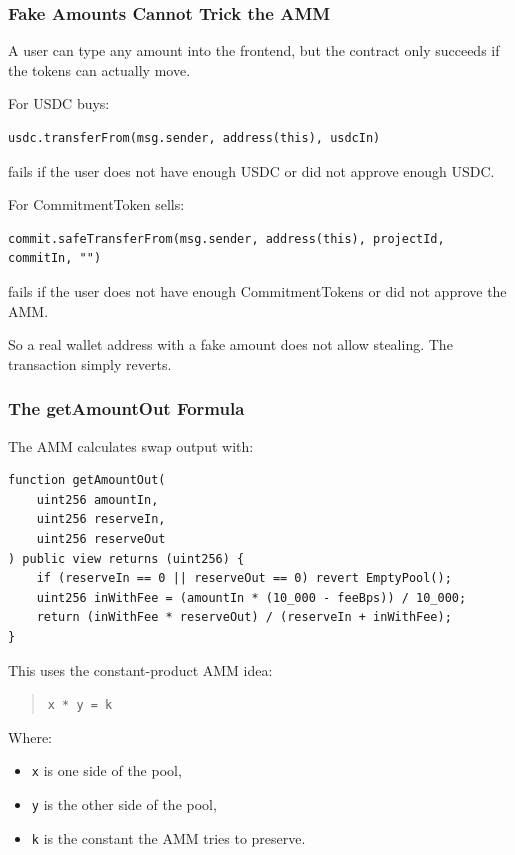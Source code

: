 \documentclass[11pt,a4paper]{article}
\begin{document}
\subsubsection{Fake Amounts Cannot Trick the AMM}

A user can type any amount into the frontend, but the contract only succeeds if the tokens can actually move.

For USDC buys:

\begin{lstlisting}
usdc.transferFrom(msg.sender, address(this), usdcIn)
\end{lstlisting}

fails if the user does not have enough USDC or did not approve enough USDC.

For CommitmentToken sells:

\begin{lstlisting}
commit.safeTransferFrom(msg.sender, address(this), projectId, commitIn, "")
\end{lstlisting}

fails if the user does not have enough CommitmentTokens or did not approve the AMM.

So a real wallet address with a fake amount does not allow stealing. The transaction simply reverts.

\subsubsection{The getAmountOut Formula}

The AMM calculates swap output with:

\begin{lstlisting}
function getAmountOut(
    uint256 amountIn,
    uint256 reserveIn,
    uint256 reserveOut
) public view returns (uint256) {
    if (reserveIn == 0 || reserveOut == 0) revert EmptyPool();
    uint256 inWithFee = (amountIn * (10_000 - feeBps)) / 10_000;
    return (inWithFee * reserveOut) / (reserveIn + inWithFee);
}
\end{lstlisting}

This uses the constant-product AMM idea:

\begin{quote}
\texttt{x * y = k}
\end{quote}

Where:

\begin{itemize}
  \item \texttt{x} is one side of the pool,
  \item \texttt{y} is the other side of the pool,
  \item \texttt{k} is the constant the AMM tries to preserve.
\end{itemize}
\end{document}
